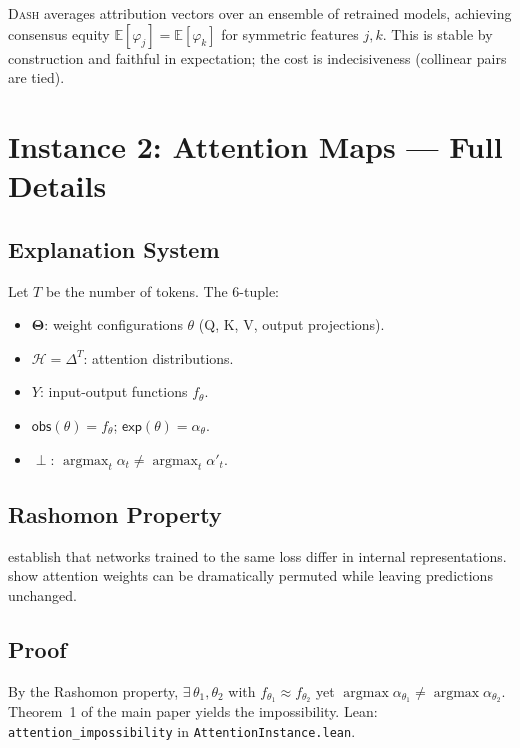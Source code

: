 \documentclass{article}
\newcommand{\E}{\mathbb{E}}
\newcommand{\DASH}{\textsc{Dash}}
\newcommand{\Params}{\mathbf{\Theta}}
\newcommand{\sH}{\mathcal{H}}
\newcommand{\incomp}{\perp}
\begin{document}
\DASH{} averages attribution vectors over an ensemble of retrained models, achieving consensus equity $\E[\varphi_j] = \E[\varphi_k]$ for symmetric features $j, k$.  This is stable by construction and faithful in expectation; the cost is indecisiveness (collinear pairs are tied).

\section{Instance 2: Attention Maps --- Full Details}
\label{sec:attn-full}

\subsection{Explanation System}

Let $T$ be the number of tokens.  The 6-tuple:
\begin{itemize}
  \item $\Params$: weight configurations $\theta$ (Q, K, V, output projections).
  \item $\sH = \Delta^T$: attention distributions.
  \item $Y$: input-output functions $f_\theta$.
  \item $\mathsf{obs}(\theta) = f_\theta$; $\mathsf{exp}(\theta) = \alpha_\theta$.
  \item $\incomp$: $\operatorname{argmax}_t \alpha_t \neq \operatorname{argmax}_t \alpha'_t$.
\end{itemize}

\subsection{Rashomon Property}

\citet{damour2022underspecification} establish that networks trained to the same loss differ in internal representations.  \citet{jainwallace2019} show attention weights can be dramatically permuted while leaving predictions unchanged.

\subsection{Proof}

By the Rashomon property, $\exists\, \theta_1, \theta_2$ with $f_{\theta_1} \approx f_{\theta_2}$ yet $\operatorname{argmax} \alpha_{\theta_1} \neq \operatorname{argmax} \alpha_{\theta_2}$.  Theorem~1 of the main paper yields the impossibility.  Lean: \texttt{attention\_impossibility} in \texttt{AttentionInstance.lean}.
\end{document}
